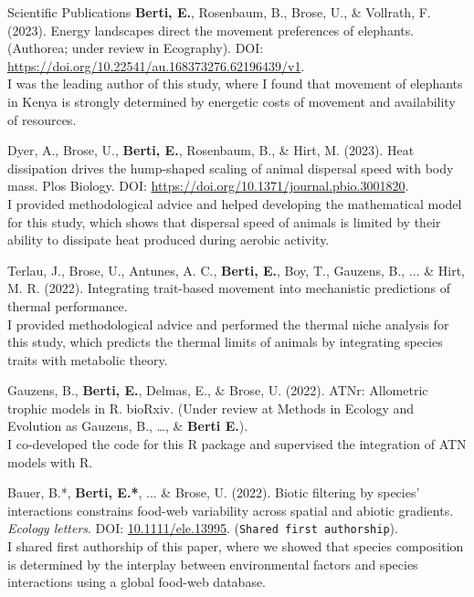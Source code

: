 \documentclass{resume} %
\begin{document}
\begin{rSection}{Scientific Publications}
\textbf{Berti, E.}, Rosenbaum, B., Brose, U., \& Vollrath, F. (2023). Energy landscapes direct the movement preferences of elephants. (Authorea; under review in Ecography). DOI: \url{https://doi.org/10.22541/au.168373276.62196439/v1}.\\
I was the leading author of this study, where I found that movement of elephants in Kenya is strongly determined by energetic costs of movement and availability of resources.

Dyer, A., Brose, U., \textbf{Berti, E.}, Rosenbaum, B., \& Hirt, M. (2023). Heat dissipation drives the hump-shaped scaling of animal dispersal speed with body mass. Plos Biology. DOI: \url{https://doi.org/10.1371/journal.pbio.3001820}.\\
I provided methodological advice and helped developing the mathematical model for this study, which shows that dispersal speed of animals is limited by their ability to dissipate heat produced during aerobic activity.

Terlau, J., Brose, U., Antunes, A. C., \textbf{Berti, E.}, Boy, T., Gauzens, B., ... \& Hirt, M. R. (2022). Integrating trait-based movement into mechanistic predictions of thermal performance.\\
I provided methodological advice and performed the thermal niche analysis for this study, which predicts the thermal limits of animals by integrating species traits with metabolic theory.

Gauzens, B., \textbf{Berti, E.}, Delmas, E., \& Brose, U. (2022). ATNr: Allometric trophic models in R. bioRxiv. (Under review at Methods in Ecology and Evolution as Gauzens, B., \dots, \& \textbf{Berti E.}).\\
I co-developed the code for this R package and supervised the integration of ATN models with R.

Bauer, B.*, \textbf{Berti, E.*}, ... \& Brose, U. (2022). Biotic filtering by species’ interactions constrains food-web variability across spatial and abiotic gradients. \textit{Ecology letters}. DOI: \href{https://doi.org/10.1111/ele.13995}{10.1111/ele.13995}. (\texttt{Shared first authorship}).\\
I shared first authorship of this paper, where we showed that species composition is determined by the interplay between environmental factors and species interactions using a global food-web database.


\end{rSection}
\end{document}

